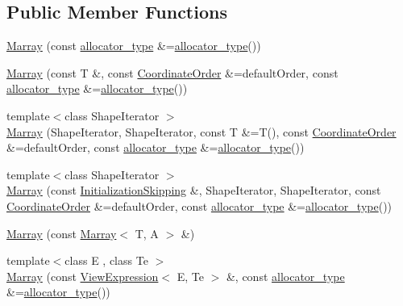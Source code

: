 \subsection*{Public Member Functions}
\begin{DoxyCompactItemize}
\item 
\hyperlink{classandres_1_1Marray_ae04d0a668897b7c72eb548c303804254}{Marray} (const \hyperlink{classandres_1_1Marray_a1e38873cb38bd8568be81bfb804deefd}{allocator\+\_\+type} \&=\hyperlink{classandres_1_1Marray_a1e38873cb38bd8568be81bfb804deefd}{allocator\+\_\+type}())
\item 
\hyperlink{classandres_1_1Marray_af0c5c9182383cc5db6ce3ef36f039b7d}{Marray} (const T \&, const \hyperlink{namespaceandres_a2ac8b7aa89d44e8188a7c0ba50f4306b}{Coordinate\+Order} \&=default\+Order, const \hyperlink{classandres_1_1Marray_a1e38873cb38bd8568be81bfb804deefd}{allocator\+\_\+type} \&=\hyperlink{classandres_1_1Marray_a1e38873cb38bd8568be81bfb804deefd}{allocator\+\_\+type}())
\item 
{\footnotesize template$<$class Shape\+Iterator $>$ }\\\hyperlink{classandres_1_1Marray_a88a89dc7f1fa0e775c6abaabb995d991}{Marray} (Shape\+Iterator, Shape\+Iterator, const T \&=T(), const \hyperlink{namespaceandres_a2ac8b7aa89d44e8188a7c0ba50f4306b}{Coordinate\+Order} \&=default\+Order, const \hyperlink{classandres_1_1Marray_a1e38873cb38bd8568be81bfb804deefd}{allocator\+\_\+type} \&=\hyperlink{classandres_1_1Marray_a1e38873cb38bd8568be81bfb804deefd}{allocator\+\_\+type}())
\item 
{\footnotesize template$<$class Shape\+Iterator $>$ }\\\hyperlink{classandres_1_1Marray_a2f4ca97b0126cd3d72519a2c0bf33f08}{Marray} (const \hyperlink{structandres_1_1InitializationSkipping}{Initialization\+Skipping} \&, Shape\+Iterator, Shape\+Iterator, const \hyperlink{namespaceandres_a2ac8b7aa89d44e8188a7c0ba50f4306b}{Coordinate\+Order} \&=default\+Order, const \hyperlink{classandres_1_1Marray_a1e38873cb38bd8568be81bfb804deefd}{allocator\+\_\+type} \&=\hyperlink{classandres_1_1Marray_a1e38873cb38bd8568be81bfb804deefd}{allocator\+\_\+type}())
\item 
\hyperlink{classandres_1_1Marray_aad23a5b853c0c69bf0e912a44d549f79}{Marray} (const \hyperlink{classandres_1_1Marray}{Marray}$<$ T, A $>$ \&)
\item 
{\footnotesize template$<$class E , class Te $>$ }\\\hyperlink{classandres_1_1Marray_a5489b4b2b1013e3232f1749d66a6db91}{Marray} (const \hyperlink{classandres_1_1ViewExpression}{View\+Expression}$<$ E, Te $>$ \&, const \hyperlink{classandres_1_1Marray_a1e38873cb38bd8568be81bfb804deefd}{allocator\+\_\+type} \&=\hyperlink{classandres_1_1Marray_a1e38873cb38bd8568be81bfb804deefd}{allocator\+\_\+type}())

\end{DoxyCompactItemize}
